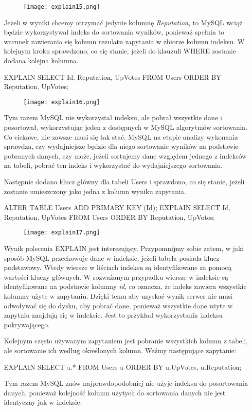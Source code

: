 \begin{figure}[H]
	\texttt{[image: explain15.png]} 
\end{figure}
Jeżeli w wyniki chcemy otrzymać jedynie kolumnę \textit{Reputation}, to MySQL wciąż będzie wykorzystywał indeks do sortowania wyników, ponieważ spełnia to warunek zawierania się kolumn rezulatu zapytania w zbiorze kolumn indeksu. W kolejnym kroku sprawdzono, co się stanie, jeżeli do klauzuli WHERE zostanie dodana kolejna kolumna.
\begin{spverbatim}
	EXPLAIN SELECT Id, Reputation, UpVotes FROM Users ORDER BY Reputation, UpVotes;
\end{spverbatim}
\begin{figure}[H]
	\texttt{[image: explain16.png]} 
\end{figure}
Tym razem MySQL nie wykorzystał indeksu, ale pobrał wszystkie dane i posortował, wykorzystując jeden z dostępnych w MySQL algorytmów sortowania. Co ciekawe, nie zawsze musi się tak stać. MySQL na etapie analizy wykonania sprawdza, czy wydajniejsze będzie dla niego sortowanie wyników na podstawie pobranych danych, czy może, jeżeli sortujemy dane względem jednego z indeksów na tabeli, pobrać ten indeks i wykorzystać do wydajniejszego sortowania.

Następnie dodano klucz główny dla tabeli Users i sprawdono, co się stanie, jeżeli zostanie umieszczony jako jedna z kolumn wyniku zapytania.
\begin{spverbatim}
	ALTER TABLE Users ADD PRIMARY KEY (Id);
	EXPLAIN SELECT Id, Reputation, UpVotes FROM Users ORDER BY Reputation, UpVotes;
\end{spverbatim}

\begin{figure}[H]
	\texttt{[image: explain17.png]} 
\end{figure}
Wynik polecenia EXPLAIN jest interesujący. Przypomnijmy sobie zatem, w jaki sposób MySQL przechowuje dane w indeksie, jeżeli tabela posiada klucz podstawowy. Wtedy wiersze w liściach indeksu są identyfikowane za pomocą wartości kluczy głównych. W rozważanym przypadku wiersze w indeksie są identyfikowane na podstawie kolumny \textit{id}, co oznacza, że indeks zawiera wszystkie kolumny użyte w zapytaniu.
Dzięki temu aby uzyskać wynik serwer nie musi odwoływać się do dysku, aby pobrać dane, ponieważ wszystkie dane użyte w zapytniu znajdują się w indeksie. Jest to przykład wykorzystania indeksu pokrywającego.

Kolejnym często używanym zapytaniem jest pobranie wszystkich kolumn z tabeli, ale sortowanie ich według określonych kolumn. Weźmy następujące zapytanie:
\begin{spverbatim}
	EXPLAIN SELECT u.* FROM Users u ORDER BY u.UpVotes, u.Reputation;
\end{spverbatim}
Tym razem MySQL znów najprawdopodobniej nie użyje indeksu do posortowania danych, ponieważ kolejność kolumn użytych do sortowania danych nie jest identyczny jak w indeksie.

